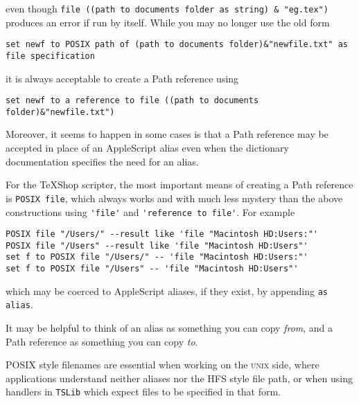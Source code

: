 \documentclass[11pt]{amsart}
\def\TeXShop{\TeX Shop\xspace}
\def\UNIX{\textsc{unix}\xspace}
\begin{document}
even though \verb|file ((path to documents folder as string) & "eg.tex")| produces an error if run by itself. While you may no longer use the old form
\begin{verbatim}
set newf to POSIX path of (path to documents folder)&"newfile.txt" as file specification
\end{verbatim}
it is always acceptable to create a Path reference using
\begin{verbatim}
set newf to a reference to file ((path to documents folder)&"newfile.txt") 
\end{verbatim}
 Moreover,  it seems to happen in some cases is that a Path reference may be accepted in place of an AppleScript alias even when the dictionary documentation specifies the need for an alias.

For the \TeXShop scripter, the most important means of creating a Path reference is {\tt POSIX file}, which always works and with much less mystery than the above constructions using \verb|'file'| and \verb|'reference to file'|. For example
\begin{verbatim}
POSIX file "/Users/" --result like 'file "Macintosh HD:Users:"'
POSIX file "/Users" --result like 'file "Macintosh HD:Users"'
set f to POSIX file "/Users/" -- 'file "Macintosh HD:Users:"'
set f to POSIX file "/Users" -- 'file "Macintosh HD:Users"'
\end{verbatim}
which may be coerced to AppleScript aliases, if they exist, by appending {\tt as alias}.

It may be helpful to think of an alias as something you can copy \emph{from}, and a Path reference as something you can copy \emph{to}. 


POSIX style filenames are essential when working on the \UNIX side, where applications understand neither aliases nor the HFS style file path, or when using handlers in {\tt TSLib} which expect files to be specified in that form.
\end{document}
